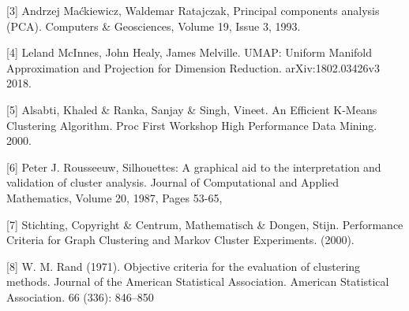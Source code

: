 \documentclass{article}
\begin{document}
[3] Andrzej Maćkiewicz, Waldemar Ratajczak, Principal components analysis (PCA). Computers \& Geosciences, Volume 19, Issue 3, 1993.

[4] Leland McInnes, John Healy, James Melville. UMAP: Uniform Manifold Approximation and Projection for Dimension Reduction. arXiv:1802.03426v3 2018.

[5] Alsabti, Khaled \& Ranka, Sanjay \& Singh, Vineet.  An Efficient K-Means Clustering Algorithm. Proc First Workshop High Performance Data Mining. 2000.

[6] Peter J. Rousseeuw, Silhouettes: A graphical aid to the interpretation and validation of cluster analysis. Journal of Computational and Applied Mathematics, Volume 20, 1987, Pages 53-65,

[7] Stichting, Copyright \& Centrum, Mathematisch \& Dongen, Stijn. Performance Criteria for Graph Clustering and Markov Cluster Experiments. (2000).

[8] W. M. Rand (1971). Objective criteria for the evaluation of clustering methods. Journal of the American Statistical Association. American Statistical Association. 66 (336): 846–850
\end{document}
